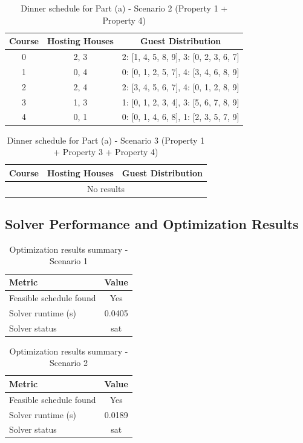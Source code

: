 \documentclass{article}
\begin{document}
\begin{table}[H]
\centering
\caption{Dinner schedule for Part (a) - Scenario 2 (Property 1 + Property 4)}
\small
\begin{tabular}{c|c|c}
\toprule
Course & Hosting Houses & Guest Distribution \\
\midrule
0 & 2, 3 & 2: [1, 4, 5, 8, 9], 3: [0, 2, 3, 6, 7] \\
1 & 0, 4 & 0: [0, 1, 2, 5, 7], 4: [3, 4, 6, 8, 9] \\
2 & 2, 4 & 2: [3, 4, 5, 6, 7], 4: [0, 1, 2, 8, 9] \\
3 & 1, 3 & 1: [0, 1, 2, 3, 4], 3: [5, 6, 7, 8, 9] \\
4 & 0, 1 & 0: [0, 1, 4, 6, 8], 1: [2, 3, 5, 7, 9] \\
\bottomrule
\end{tabular}
\end{table}

\begin{table}[H]
\centering
\caption{Dinner schedule for Part (a) - Scenario 3 (Property 1 + Property 3 + Property 4)}
\small
\begin{tabular}{c|c|c}
\toprule
Course & Hosting Houses & Guest Distribution \\
\midrule
\multicolumn{3}{c}{No results} \\
\bottomrule
\end{tabular}
\end{table}

\subsection{Solver Performance and Optimization Results}

\begin{table}[H]
\centering
\caption{Optimization results summary - Scenario 1}
\begin{tabular}{l c}
\toprule
Metric & Value \\
\midrule
Feasible schedule found & Yes \\
Solver runtime (s) & 0.0405 \\
Solver status & sat \\
\bottomrule
\end{tabular}
\end{table}

\begin{table}[H]
\centering
\caption{Optimization results summary - Scenario 2}
\begin{tabular}{l c}
\toprule
Metric & Value \\
\midrule
Feasible schedule found & Yes \\
Solver runtime (s) & 0.0189 \\
Solver status & sat \\
\bottomrule
\end{tabular}
\end{table}
\end{document}
